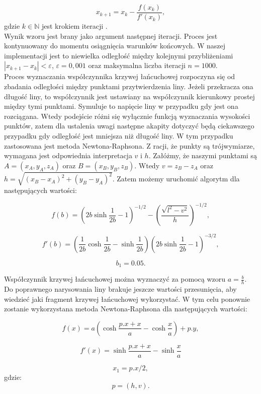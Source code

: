 \[
	x_{k+1} = x_k - \frac{f(x_k)}{f'(x_k)},
\]
gdzie $k \in \mathbb{N}$ jest krokiem iteracji .
\\

Wynik wzoru jest brany jako argument następnej iteracji. Proces jest kontynuowany do momentu osiągnięcia warunków końcowych. W naszej implementacji jest to niewielka odległość między kolejnymi przybliżeniami $ | x_{k+1} - x_k | < \varepsilon$, $\varepsilon = 0,001$ oraz maksymalna liczba iteracji $n=1000$.
\\

Proces wyznaczania współczynnika krzywej łańcuchowej rozpoczyna się od zbadania odległości między punktami przytwierdzenia liny. Jeżeli przekracza ona długość liny, to współczynnik jest ustawiany na współczynnik kierunkowy prostej między tymi punktami. Symuluje to napięcie liny w przypadku gdy jest ona rozciągana. Wtedy podejście różni się wyłącznie funkcją wyznaczania wysokości punktów, zatem dla ustalenia uwagi następne akapity dotyczyć będą ciekawszego przypadku gdy odległość jest mniejsza niż długość liny. W tym przypadku zastosowana jest metoda Newtona-Raphsona. Z racji, że punkty są trójwymiarze, wymagana jest odpowiednia interpretacja $v$ i $h$. Załóżmy, że naszymi punktami są $A = (x_A, y_A, z_A)$ oraz $B= (x_B, y_B, z_B)$. Wtedy $v = z_B - z_A$ oraz $ h = \sqrt{(x_B - x_A)^2 + (y_B - y_A)^2}$. Zatem możemy uruchomić algorytm dla następujących wartości:

$$
	f(b) = \left( 2b\sinh\frac{1}{2b} - 1 \right)^{-1/2} - \left( \frac{\sqrt{l^2 - v^2}}{h} \right)^{-1/2},
$$

$$
	f'(b) = \left( \frac{1}{2b} \cosh \frac{1}{2b} - \sinh \frac{1}{2b} \right) \left( 2b \sinh \frac{1}{2b} - 1 \right) ^ {-3/2},
$$

$$
b_1 = 0.05. 
$$

Współczynnik krzywej łańcuchowej można wyznaczyć za pomocą wzoru $a = \frac{b}{h}$.
\\

Do poprawnego narysowania liny brakuje jeszcze wartości przesunięcia, aby wiedzieć jaki fragment krzywej łańcuchowej wykorzystać. W tym celu ponownie zostanie wykorzystana metoda Newtona-Raphsona dla następujących wartości:


$$
f(x) =  a \left( \cosh \frac{p.x + x}{a} - \cosh \frac{x}{a} \right) + p.y,
$$

$$
f'(x) = \sinh \frac{p.x + x}{a} - \sinh \frac{x}{a}
$$

$$
x_1 = p.x / 2,
$$
gdzie:
$$
p = (h, v).
$$


